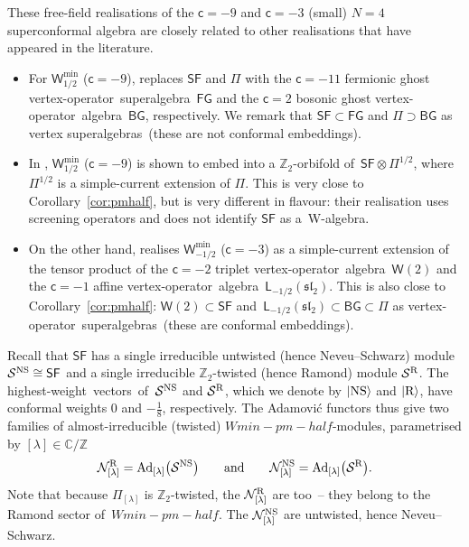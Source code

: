\documentclass[10pt,a4paper]{amsart}
\numberwithin{equation}{section}
\newcommand{\cc}{\mathsf{c}} %
\newcommand{\kk}{\mathsf{k}} %
\newcommand{\NS}{\textnormal{NS}}
\newcommand{\R}{\textnormal{R}}
\DeclarePairedDelimiter{\ket}{\lvert}{\rangle}
\newcommand{\fld}[1]{\mathbb{#1}} %
\newcommand{\alg}[1]{\mathfrak{#1}} %
\newcommand{\VOA}[1]{\mathsf{#1}} %
\newcommand{\Mod}[1]{\mathcal{#1}} %
\newcommand{\categ}[1]{\mathrm{#1}} %
\newcommand{\ZZ}{\fld{Z}}
\newcommand{\CC}{\fld{C}}
\newcommand{\SLA}[2]{\alg{#1}_{#2}} %
\newcommand{\sltwo}{\SLA{sl}{2}}
\newcommand{\bgsymb}{\VOA{BG}}
\newcommand{\fgsymb}{\VOA{FG}}
\newcommand{\sfsymb}{\VOA{SF}}
\newcommand{\lsymb}{\Pi}
\newcommand{\bgvoa}{\bgsymb} %
\newcommand{\fgvoa}{\fgsymb} %
\newcommand{\sfvoa}{\sfsymb} %
\newcommand{\lvoa}{\lsymb} %
\newcommand{\saff}[2]{\VOA{L}_{#1}(#2)} %
\newcommand{\ssl}[1][\kk]{\saff{#1}{\sltwo}} %
\newcommand{\swalg}[2]{\VOA{W}_{#1}^{\mathrm{#2}}} %
\newcommand{\smin}[1][\kk]{\swalg{#1}{min}} %
\newcommand{\sminpmhalf}{\smin[\pm 1/2]}
\newcommand{\sfnsvac}{\ket{\NS}} %
\newcommand{\sfrvac}{\ket{\R}} %
\newcommand{\lmod}[1]{\lsymb_{[#1]}} %
\newcommand{\sfnsmod}{\Mod{S}^{\NS}} %
\newcommand{\sfrmod}{\Mod{S}^{\R}} %
\newcommand{\nnsind}[1]{\Mod{N}^{\NS}_{[#1]}} %
\newcommand{\nrind}[1]{\Mod{N}^{\R}_{[#1]}}
\newcommand{\adfunc}[1]{\categ{Ad}_{[#1]}}
\newcommand{\ns}{Neveu--Schwarz}
\newcommand{\hw}{highest-weight}
\newcommand{\hwv}{\hw\ vector}
\newcommand{\hwvs}{\hwv s}
\newcommand{\vo}{vertex-operator}
\newcommand{\voa}{\vo\ algebra}
\newcommand{\svoa}{\vo\ superalgebra}
\newcommand{\svoas}{\svoa s}
\newcommand{\sva}{vertex superalgebra}
\newcommand{\svas}{\sva s}
\def\smash#1{#1}
\def\sminpmhalf{Wmin-pm-half}
\begin{document}
These free-field realisations of the $\cc=-9$ and $\cc=-3$ (small) $N=4$ superconformal algebra are closely related to other realisations that have appeared in the literature.
\begin{itemize}\itemsep=0pt
	\item For $\smin[1/2]$ ($\cc=-9$), \cite[Proposition~5.1 and Theorem~6.1]{AdaRea14} replaces $\sfvoa$ and $\lvoa$ with the $\cc=-11$ fermionic ghost \svoa\ $\fgvoa$ and the $\cc=2$ bosonic ghost \voa\ $\bgvoa$, respectively.
	We remark that $\sfvoa \subset \fgvoa$ and $\lvoa \supset \bgvoa$ as \svas\ (these are not conformal embeddings).
	\item In \cite[Proposition~1]{AdaVer20}, \smash{$\smin[1/2]$} ($\cc=-9$) is shown to embed into a $\ZZ_2$-orbifold of~\smash{$\sfvoa \otimes \lvoa^{1/2}$}, where~\smash{$\lvoa^{1/2}$} is a simple-current extension of $\lvoa$.
	This is very close to Corollary~\ref{cor:pmhalf}, but is very different in flavour: their realisation uses screening operators and does not identify $\sfvoa$ as a~W-algebra.
	\item On the other hand, \cite[Theorem~4.14]{CreSim15} realises \smash{$\smin[-1/2]$} ($\cc=-3$) as a simple-current extension of the tensor product of the $\cc=-2$ triplet \voa\ $\VOA{W}(2)$ and the $\cc=-1$ affine \voa\ $\ssl[-1/2]$.
	This is also close to Corollary~\ref{cor:pmhalf}: $\VOA{W}(2) \subset \sfvoa$ and~${\ssl[-1/2] \subset \bgvoa \subset \lvoa}$ as \svoas\ (these are conformal embeddings).
\end{itemize}

Recall that $\sfvoa$ has a single irreducible untwisted (hence \ns) module $\sfnsmod \cong \sfvoa$ and a single irreducible $\ZZ_2$-twisted (hence Ramond) module $\sfrmod$.
The \hwvs\ of~$\sfnsmod$ and $\sfrmod$, which we denote by $\sfnsvac$ and $\sfrvac$, have conformal weights $0$ and $-\frac{1}{8}$, respectively.
The Adamovi\'{c} functors thus give two families of almost-irreducible (twisted) \smash{$\sminpmhalf$}-modules, parametrised by $[\lambda] \in \CC/\ZZ$
\begin{equation} \label{eq:defN}
	\nrind{\lambda} = \adfunc{\lambda}\big(\sfnsmod\big) \qquad \text{and} \qquad
	\nnsind{\lambda} = \adfunc{\lambda}\big(\sfrmod\big).
\end{equation}
Note that because \smash{$\lmod{\lambda}$} is $\ZZ_2$-twisted, the \smash{$\nrind{\lambda}$} are too~-- they belong to the Ramond sector of~$\sminpmhalf$.
The \smash{$\nnsind{\lambda}$} are untwisted, hence \ns.
\end{document}
